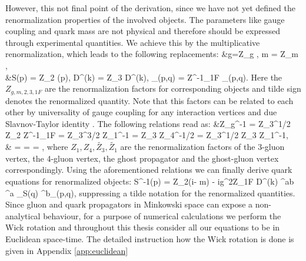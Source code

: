 However, this not final point of the derivation, since we have not yet defined the renormalization properties of the involved objects. The parameters like gauge coupling and quark mass are not physical and therefore should be expressed through experimental quantities. We achieve this by the multiplicative renormalization, which leads to the following replacements:
\beqa
	\label{dse:renorm}
\notag	&g=Z_g \;, \;\;\; m = Z_m \;, \\
	&S(p) = Z_2 (p)\;, \;\; D^{\mu\nu}(k) = Z_3 \tilde D^{\mu\nu}(k)\;, \;\; \Gamma_\nu(p,q) = Z^{-1}_{1F} \tilde \Gamma_\nu(p,q)\;. \;\; \;\;\;\;\;\;
\eeqa
Here the $Z_{g,m,2,3,1F}$ are the renormalization factors for corresponding objects and tilde sign denotes the renormalized quantity. Note that this factors can be related to each other by universality of gauge coupling for any interaction vertices and due Slavnov-Taylor identity \cite{0201524724}. The following relations read as:
\beqa
	\label{dse:renorm_relations}
	&Z_g^{-1} = Z_3^{1/2} Z_2 Z^{-1}_{1F} = Z_3^{3/2} Z_1^{-1} = Z_3 Z_4^{-1/2} = Z_3^{1/2} \tilde Z_3 \tilde Z_1^{-1}\;, \\
	& =  =  = \;,
\eeqa
where $Z_1, Z_4, \tilde{Z_3}, \tilde{Z_1}$ are the renormalization factors of the 3-gluon vertex, the 4-gluon vertex, the ghost propagator and the ghost-gluon vertex correspondingly. Using the aforementioned relations we can finally derive quark \DS equations for renormalized objects: 
\beqa
	\label{dse:DSE_full_renorm}
	S^{-1}(p) = Z_2(i\dslash - m) - ig^2Z_{1F}\int {} D^{\mu\nu}(k) \delta^{ab} \lambda^a \gamma_\mu S(q) \Gamma^b_\nu(p,q)\;,\;\;
\eeqa
suppressing a tilde notation for the renormalized quantities. Since gluon and quark propagators in Minkowski space can expose a non-analytical behaviour, for a purpose of numerical calculations we perform the Wick rotation \cite{PhysRev.96.1124} and throughout this thesis consider all our equations to be in Euclidean space-time. The detailed instruction how the Wick rotation is done is given in Appendix \ref{app:euclidean} \\

